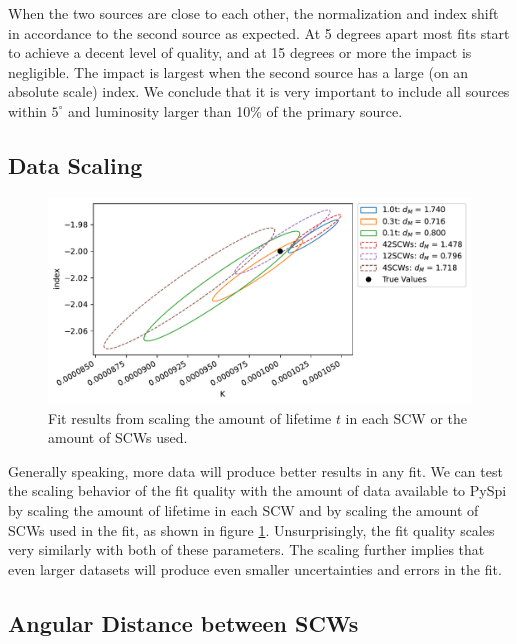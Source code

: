\documentclass{report}
\begin{document}
When the two sources are close to each other, the normalization and index shift in accordance to the second source as expected. At 5 degrees apart most fits start to achieve a decent level of quality, and at 15 degrees or more the impact is negligible. The impact is largest when the second source has a large (on an absolute scale) index. We conclude that it is very important to include all sources within $5^\circ$ and luminosity larger than 10\% of the primary source.

\FloatBarrier

\subsection{Data Scaling}

\begin{figure}[h]
  \centering
  \includegraphics[width=\textwidth]{Images/Pure_Simulation/combined_plot_data_scaling.pdf}
  \caption{Fit results from scaling the amount of lifetime $t$ in each SCW or the amount of SCWs used.}
  \label{fig data scaling}
\end{figure}

Generally speaking, more data will produce better results in any fit. We can test the scaling behavior of the fit quality with the amount of data available to PySpi by scaling the amount of lifetime in each SCW and by scaling the amount of SCWs used in the fit, as shown in figure \ref{fig data scaling}. Unsurprisingly, the fit quality scales very similarly with both of these parameters. The scaling further implies that even larger datasets will produce even smaller uncertainties and errors in the fit. 


\subsection{Angular Distance between SCWs}
\end{document}
